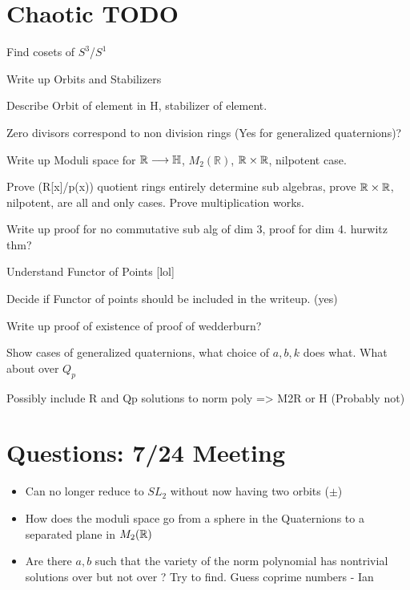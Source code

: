 \documentclass{article}
\newcommand{\cmark}{\color{red} \ding{51}}%
\newcommand{\done}{\rlap{$\square$}{\raisebox{2pt}{\large\hspace{1pt}\cmark}}%
\hspace{-2.5pt}}
\begin{document}
\section{Chaotic TODO}
\begin{todolist}
    \item Find cosets of $S^3$/$S^1$ 
    \item Write up Orbits and Stabilizers 
    \item Describe Orbit of element in H, stabilizer of element. 
    \item[\done] Zero divisors correspond to non division rings (Yes for generalized quaternions)? 
    \item Write up Moduli space for $\mathbb{R} \longrightarrow \protect\mathbb{H}$, $M_2(\mathbb{R})$, $\protect\mathbb{R} \times \protect\mathbb{R}$, nilpotent case. 
    \item Prove (R[x]/p(x)) quotient rings entirely determine sub algebras, prove $\protect\mathbb{R} \times \protect\mathbb{R}$, nilpotent, \bC are all and only cases. Prove multiplication works.
    \item Write up proof for no commutative sub alg of dim 3, proof for dim 4.  hurwitz thm?
    \item Understand Functor of Points [lol]
    \item[\done] Decide if Functor of points should be included in the writeup. (yes)
    \item Write up proof of existence of proof of wedderburn?
    \item Show cases of generalized quaternions, what choice of  $a, b, k$ does what. What about over $Q_p$
    \item Possibly include R and Qp solutions to norm poly => M2R or H (Probably not)
\end{todolist}

\section{Questions: 7/24 Meeting}
\begin{itemize}
    \item Can no longer reduce to $SL_2$ without now having two orbits ($\pm$)
    \item How does the moduli space go from a sphere in the Quaternions to a separated plane in       $M_2(\protect\mathbb{R})$
    \item Are there $a, b$ such that the variety of the norm polynomial has nontrivial solutions over \bR but not over \bQ? Try to find. Guess coprime numbers - Ian 
\end{itemize}
\end{document}
